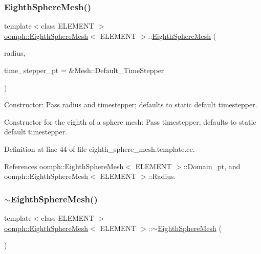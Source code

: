 \subsubsection{\texorpdfstring{Eighth\+Sphere\+Mesh()}{EighthSphereMesh()}}
{\footnotesize\ttfamily template$<$class E\+L\+E\+M\+E\+NT $>$ \\
\hyperlink{classoomph_1_1EighthSphereMesh}{oomph\+::\+Eighth\+Sphere\+Mesh}$<$ E\+L\+E\+M\+E\+NT $>$\+::\hyperlink{classoomph_1_1EighthSphereMesh}{Eighth\+Sphere\+Mesh} (\begin{DoxyParamCaption}\item[{const double \&}]{radius,  }\item[{Time\+Stepper $\ast$}]{time\+\_\+stepper\+\_\+pt = {\ttfamily \&Mesh\+:\+:Default\+\_\+TimeStepper} }\end{DoxyParamCaption})}



Constructor\+: Pass radius and timestepper; defaults to static default timestepper. 

Constructor for the eighth of a sphere mesh\+: Pass timestepper; defaults to static default timestepper. 

Definition at line 44 of file eighth\+\_\+sphere\+\_\+mesh.\+template.\+cc.



References oomph\+::\+Eighth\+Sphere\+Mesh$<$ E\+L\+E\+M\+E\+N\+T $>$\+::\+Domain\+\_\+pt, and oomph\+::\+Eighth\+Sphere\+Mesh$<$ E\+L\+E\+M\+E\+N\+T $>$\+::\+Radius.

\mbox{\label{classoomph_1_1EighthSphereMesh_a425c3de92974d00dbb126f4cbbaf8e3b}} 
\subsubsection{\texorpdfstring{$\sim$\+Eighth\+Sphere\+Mesh()}{~EighthSphereMesh()}}
{\footnotesize\ttfamily template$<$class E\+L\+E\+M\+E\+NT $>$ \\
\hyperlink{classoomph_1_1EighthSphereMesh}{oomph\+::\+Eighth\+Sphere\+Mesh}$<$ E\+L\+E\+M\+E\+NT $>$\+::$\sim$\hyperlink{classoomph_1_1EighthSphereMesh}{Eighth\+Sphere\+Mesh} (\begin{DoxyParamCaption}{ }\end{DoxyParamCaption})\hspace{0.3cm}{\ttfamily [inline]}}



